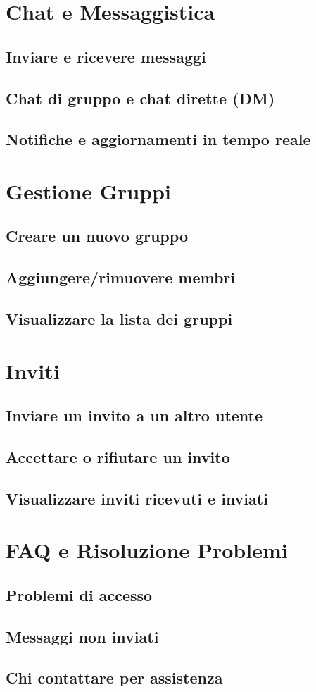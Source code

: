 \documentclass[a4paper,12pt]{book}
\begin{document}
\chapter{Chat e Messaggistica}
\section{Inviare e ricevere messaggi}
\section{Chat di gruppo e chat dirette (DM)}
\section{Notifiche e aggiornamenti in tempo reale}

\chapter{Gestione Gruppi}
\section{Creare un nuovo gruppo}
\section{Aggiungere/rimuovere membri}
\section{Visualizzare la lista dei gruppi}

\chapter{Inviti}
\section{Inviare un invito a un altro utente}
\section{Accettare o rifiutare un invito}
\section{Visualizzare inviti ricevuti e inviati}

\chapter{FAQ e Risoluzione Problemi}
\section{Problemi di accesso}
\section{Messaggi non inviati}
\section{Chi contattare per assistenza}
\end{document}
